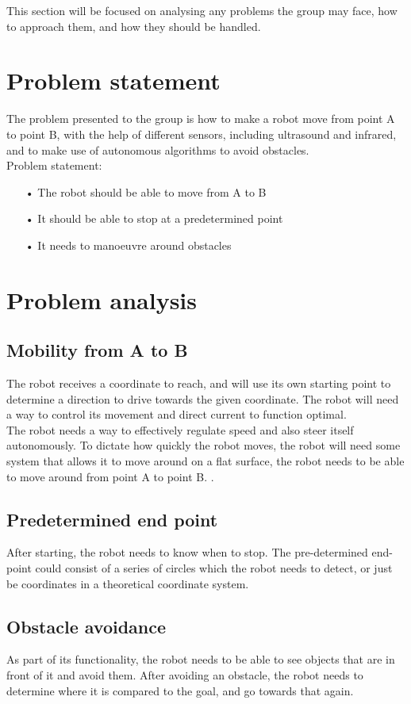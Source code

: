 This section will be focused on analysing any problems the group may face, how to approach them, and how they should be handled.

\section{Problem statement}

The problem presented to the group is how to make a robot move from point A to point B, with the help of different sensors, including ultrasound and infrared, and to make use of autonomous algorithms to avoid obstacles. \\

Problem statement:
\begin{enumerate}
\item[•]The robot should be able to move from A to B
\item[•]It should be able to stop at a predetermined point
\item[•]It needs to manoeuvre around obstacles
\end{enumerate}

\section{Problem analysis}
\subsection{Mobility from A to B}
The robot receives a coordinate to reach, and will use its own starting point to determine a direction to drive towards the given coordinate. The robot will need a way to control its movement and direct current to function optimal.\\
The robot needs a way to effectively regulate speed and also steer itself autonomously. To dictate how quickly the robot moves, the robot will need some system that allows it to move around on a flat surface, the robot needs to be able to move around from point A to point B.
.\

\subsection{Predetermined end point}
After starting, the robot needs to know when to stop. The pre-determined end-point could consist of a series of circles which the robot needs to detect, or just be coordinates in a theoretical coordinate system.

\subsection{Obstacle avoidance}
As part of its functionality, the robot needs to be able to see objects that are in front of it and avoid them. After avoiding an obstacle, the robot needs to determine where it is compared to the goal, and go towards that again.

